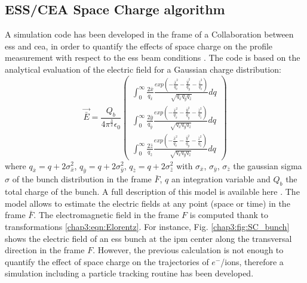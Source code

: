 \begin{refsection}
  \subsection{ESS/CEA Space Charge algorithm}
  A simulation code has been developed in the frame of a Collaboration between \acrshort{ess} and \acrshort{cea}, in order to quantify the effects of space charge on the profile measurement with respect to the \acrshort{ess} beam conditions \cite{Thomas-2016-1,Belloni2018}. The code is based on the analytical evaluation of the electric field for a Gaussian charge distribution:
  \begin{equation}
    \vec{\bar{E}} = \frac{Q_{b}}{4 \pi^{\frac{3}{2}} \epsilon_{0}} 
    \begin{pmatrix}
      \displaystyle\int^{\infty}_{0} \frac{2 \bar{x}}{q_{\bar{x}}} \frac{exp(-\frac{\bar{x}^{2}}{q_{\bar{x}}} -\frac{\bar{y}^{2}}{q_{\bar{y}}} -\frac{\bar{z}^{2}}{q_{\bar{z}}})}{\sqrt{q_{\bar{x}} q_{\bar{y}} q_{\bar{z}} }}dq\\
      \displaystyle\int^{\infty}_{0} \frac{2 \bar{y}}{q_{\bar{y}}} \frac{exp(-\frac{\bar{x}^{2}}{q_{\bar{x}}} -\frac{\bar{y}^{2}}{q_{\bar{y}}} -\frac{\bar{z}^{2}}{q_{\bar{z}}})}{\sqrt{q_{\bar{x}} q_{\bar{y}} q_{\bar{z}} }}dq\\
      \displaystyle\int^{\infty}_{0} \frac{2 \bar{z}}{q_{\bar{z}}} \frac{exp(-\frac{\bar{x}^{2}}{q_{\bar{x}}} -\frac{\bar{y}^{2}}{q_{\bar{y}}} -\frac{\bar{z}^{2}}{q_{\bar{z}}})}{\sqrt{q_{\bar{x}} q_{\bar{y}} q_{\bar{z}} }}dq
    \end{pmatrix}
  \end{equation}
  where $q_{\bar{x}} = q + 2\sigma_{\bar{x}}^{2}$, $q_{\bar{y}} = q + 2\sigma_{\bar{y}}^{2}$, $q_{\bar{z}} = q + 2\sigma_{\bar{z}}^{2}$ with $\sigma_{\bar{x}}$, $\sigma_{\bar{y}}$, $\sigma_{\bar{z}}$ the gaussian sigma $\sigma$ of the bunch distribution in the frame $\bar{F}$, $q$ an integration variable and $Q_{b}$ the total charge of the bunch.
  A full description of this model is available here \cite{Wanzenberg2010}.
  The model allows to estimate the electric fields at any point (space or time) in the frame $\bar{F}$. The electromagnetic field in the frame $F$ is computed thank to transformations \ref{chap3:eqn:Elorentz}. For instance, Fig. \ref{chap3:fig:SC_bunch} shows the electric field of an \acrshort{ess} bunch at the \acrshort{ipm} center along the transversal direction in the frame $F$. However, the previous calculation is not enough to quantify the effect of space charge on the trajectories of $e^{-}$/ions, therefore a simulation including a particle tracking routine has been developed.


\end{refsection}
